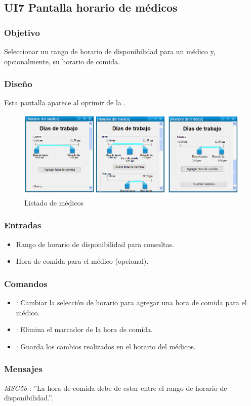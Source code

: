   
\subsection{UI7 Pantalla horario de médicos}

\subsubsection{Objetivo}
   Seleccionar un rango de horario de disponibilidad para un médico y, opcionalmente, su horario de comida.

\subsubsection{Diseño}
    Esta pantalla aparece al oprimir  de la .

\begin{figure}[htbp!]
  \centering
    \includegraphics[width=1\textwidth]{images/UI5Gerente3}
    \caption{Listado de médicos}
\end{figure}

\subsubsection{Entradas}
\begin{itemize}
  \item Rango de horario de disponibilidad para consultas.
  \item Hora de comida para el médico (opcional).
\end{itemize}  
  

\subsubsection{Comandos}
\begin{itemize}
    \item {}: Cambiar la selección de horario para agregar una hora de comida para el médico.
    \item {}: Elimina el marcador de la hora de comida.
    \item {}: Guarda los cambios realizados en el horario del médicos.
\end{itemize}

\subsubsection{Mensajes}
{\em MSG5b-}: ''La hora de comida debe de estar entre el rango de horario de disponibilidad.''.
 
 
